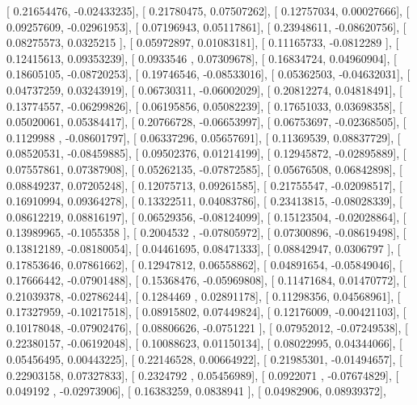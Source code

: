 \documentclass{article}
\begin{document}
       [ 0.21654476, -0.02433235],
       [ 0.21780475,  0.07507262],
       [ 0.12757034,  0.00027666],
       [ 0.09257609, -0.02961953],
       [ 0.07196943,  0.05117861],
       [ 0.23948611, -0.08620756],
       [ 0.08275573,  0.0325215 ],
       [ 0.05972897,  0.01083181],
       [ 0.11165733, -0.0812289 ],
       [ 0.12415613,  0.09353239],
       [ 0.0933546 ,  0.07309678],
       [ 0.16834724,  0.04960904],
       [ 0.18605105, -0.08720253],
       [ 0.19746546, -0.08533016],
       [ 0.05362503, -0.04632031],
       [ 0.04737259,  0.03243919],
       [ 0.06730311, -0.06002029],
       [ 0.20812274,  0.04818491],
       [ 0.13774557, -0.06299826],
       [ 0.06195856,  0.05082239],
       [ 0.17651033,  0.03698358],
       [ 0.05020061,  0.05384417],
       [ 0.20766728, -0.06653997],
       [ 0.06753697, -0.02368505],
       [ 0.1129988 , -0.08601797],
       [ 0.06337296,  0.05657691],
       [ 0.11369539,  0.08837729],
       [ 0.08520531, -0.08459885],
       [ 0.09502376,  0.01214199],
       [ 0.12945872, -0.02895889],
       [ 0.07557861,  0.07387908],
       [ 0.05262135, -0.07872585],
       [ 0.05676508,  0.06842898],
       [ 0.08849237,  0.07205248],
       [ 0.12075713,  0.09261585],
       [ 0.21755547, -0.02098517],
       [ 0.16910994,  0.09364278],
       [ 0.13322511,  0.04083786],
       [ 0.23413815, -0.08028339],
       [ 0.08612219,  0.08816197],
       [ 0.06529356, -0.08124099],
       [ 0.15123504, -0.02028864],
       [ 0.13989965, -0.1055358 ],
       [ 0.2004532 , -0.07805972],
       [ 0.07300896, -0.08619498],
       [ 0.13812189, -0.08180054],
       [ 0.04461695,  0.08471333],
       [ 0.08842947,  0.0306797 ],
       [ 0.17853646,  0.07861662],
       [ 0.12947812,  0.06558862],
       [ 0.04891654, -0.05849046],
       [ 0.17666442, -0.07901488],
       [ 0.15368476, -0.05969808],
       [ 0.11471684,  0.01470772],
       [ 0.21039378, -0.02786244],
       [ 0.1284469 ,  0.02891178],
       [ 0.11298356,  0.04568961],
       [ 0.17327959, -0.10217518],
       [ 0.08915802,  0.07449824],
       [ 0.12176009, -0.00421103],
       [ 0.10178048, -0.07902476],
       [ 0.08806626, -0.0751221 ],
       [ 0.07952012, -0.07249538],
       [ 0.22380157, -0.06192048],
       [ 0.10088623,  0.01150134],
       [ 0.08022995,  0.04344066],
       [ 0.05456495,  0.00443225],
       [ 0.22146528,  0.00664922],
       [ 0.21985301, -0.01494657],
       [ 0.22903158,  0.07327833],
       [ 0.2324792 ,  0.05456989],
       [ 0.0922071 , -0.07674829],
       [ 0.049192  , -0.02973906],
       [ 0.16383259,  0.0838941 ],
       [ 0.04982906,  0.08939372],
\end{document}
